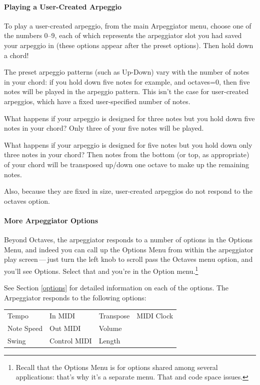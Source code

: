\documentclass{article}
\begin{document}
\paragraph{Playing a User-Created Arpeggio}

To play a user-created arpeggio, from the main Arpeggiator menu, choose one of the numbers 0--9, each of which represents the arpeggiator slot you had saved your arpeggio in (these options appear after the preset options).  Then hold down a chord!

The preset arpeggio patterns (such as Up-Down) vary with the number of notes in your chord: if you hold down five notes for example, and octaves=0, then five notes will be played in the arpeggio pattern.  This isn't the case for user-created arpeggios, which have a fixed user-specified number of notes.

What happens if your arpeggio is designed for three notes but you hold down  five notes in your chord?  Only three of your five notes will be played.

What happens if your arpeggio is designed for five notes but you hold down only three notes in your chord?  Then notes from the bottom (or top, as appropriate) of your chord will be transposed up/down one octave to make up the remaining notes.

Also, because they are fixed in size, user-created arpeggios do not respond to the octaves option.

\paragraph{More Arpeggiator Options}

Beyond Octaves, the arpeggiator responds to a number of options in the Options Menu, and indeed you can call up the Options Menu from within the arpeggiator play screen\,---\,just turn the left knob to scroll pass the Octaves menu option, and you'll see Options.  Select that and you're in the Option menu.\footnote{Recall that the Options Menu is for options shared among several applications: that's why it's a separate menu.  That and code space issues.}

See Section \ref{options} for detailed information on each of the options.  The Arpeggiator responds to the following options:

\vspace{1em}
\begin{tabular}{llll}
Tempo& 			In MIDI&		Transpose&	MIDI Clock\\
Note Speed& 		Out MIDI& 	Volume	&\\
Swing& 			Control MIDI&	Length	&\\
\end{tabular}
\end{document}
